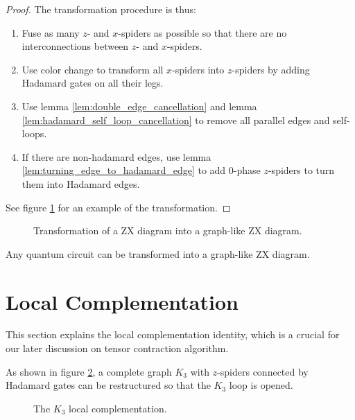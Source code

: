 \begin{proof}
	The transformation procedure is thus: 
	\begin{enumerate}
		\item Fuse as many $z$- and $x$-spiders as possible so that there are no interconnections between $z$- and $x$-spiders. 
		\item Use color change to transform all $x$-spiders into $z$-spiders by adding Hadamard gates on all their legs. 
		\item Use lemma \ref{lem:double_edge_cancellation} and lemma \ref{lem:hadamard_self_loop_cancellation} to remove all parallel edges and self-loops.	
		\item If there are non-hadamard edges, use lemma \ref{lem:turning_edge_to_hadamard_edge} to add 0-phase $z$-spiders to turn them into Hadamard edges.
	\end{enumerate}
	
	See figure \ref{fig:graph_like_transformation} for an example of the transformation.
\end{proof}

\begin{figure}[ht]
	\centering
	\resizebox{0.8\linewidth}{!}{
		
	}
	\caption{Transformation of a ZX diagram into a graph-like ZX diagram.}
	\label{fig:graph_like_transformation}
\end{figure}


\begin{lemma}
	Any quantum circuit can be transformed into a graph-like ZX diagram.
\end{lemma}

\section{Local Complementation}

This section explains the local complementation identity, which is a crucial for our later discussion on tensor contraction algorithm.

\begin{lemma}
	As shown in figure \ref{fig:k3_local_complementation}, a complete graph $K_{3}$ with 
	$z$-spiders connected by Hadamard gates can be restructured so that the $K_{3}$ loop is opened.
	\begin{figure}
		\centering
		\resizebox{0.8\linewidth}{!}{
			
		}
		\caption{The $K_3$ local complementation.}
		\label{fig:k3_local_complementation}
	\end{figure} 
\end{lemma}\label{lem:k3_local_complementation}

